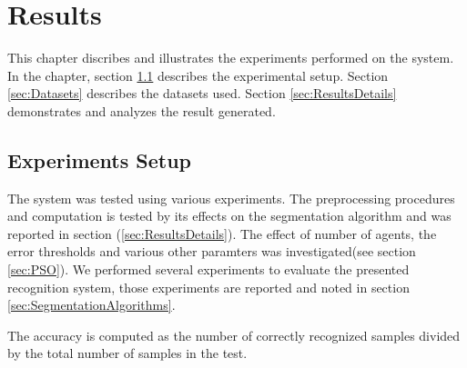 \chapter{Results}


This chapter discribes and illustrates the experiments performed on the system. In the chapter, section \ref{sec:ExperimentsSetup} describes the experimental setup. Section \ref{sec:Datasets} describes the datasets used. Section \ref{sec:ResultsDetails} demonstrates and analyzes the result generated. 

\section{Experiments Setup}
\label{sec:ExperimentsSetup}
The system was tested using various experiments. The preprocessing procedures and computation is tested by its effects on the segmentation algorithm and was reported in section (\ref{sec:ResultsDetails}). The effect of number of agents, the error thresholds and various other paramters was investigated(see section \ref{sec:PSO}). We performed several experiments to evaluate the presented recognition system, those experiments are reported and noted in section \ref{sec:SegmentationAlgorithms}.

 The accuracy is computed as the number of correctly recognized samples divided by the total number of samples in the test. 
